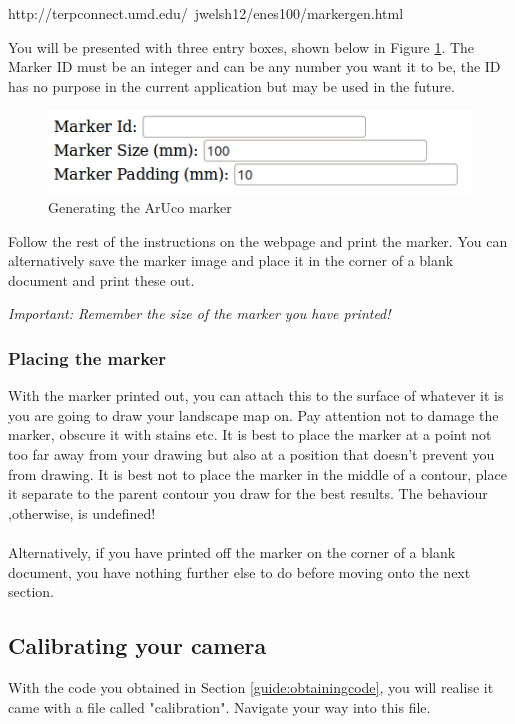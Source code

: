 \documentclass[11pt]{article}
\begin{document}
\begin{center}
http://terpconnect.umd.edu/~jwelsh12/enes100/markergen.html
\end{center}

You will be presented with three entry boxes, shown below in
Figure \ref{guide:markergeneration}. The Marker ID must be an integer
and can be any number you want it to be, the ID has no purpose in
the current application but may be used in the future. 

\begin{figure}[!h]
	\centering
	\includegraphics[scale=0.8]{userguide/markersite.png}
	\caption{Generating the ArUco marker}
	\label{guide:markergeneration}
\end{figure}

Follow the rest of the instructions on the webpage and print the marker.
You can alternatively save the marker image and place it in the corner of a
blank document and print these out.
\begin{center}
	\textit{Important: Remember the size of the marker you have printed!}
\end{center}

\subsubsection*{Placing the marker}
With the marker printed out, you can attach this to the surface of 
whatever it is you are going to draw your landscape map on. Pay
attention not to damage the marker, obscure it with stains etc. It
is best to place the marker at a point not too far away from your
drawing but also at a position that doesn't prevent you from drawing.
It is best not to place the marker in the middle of a contour,
place it separate to the parent contour you draw for the best
results. The behaviour ,otherwise, is undefined!\\
\\
Alternatively, if you have printed off the marker on the corner of 
a blank document, you have nothing further else to do before moving onto 
the next section.

\newpage
\subsection{Calibrating your camera}
With the code you obtained in Section \ref{guide:obtainingcode}, you
will realise it came with a file called "calibration". Navigate your way 
into this file.
\end{document}
